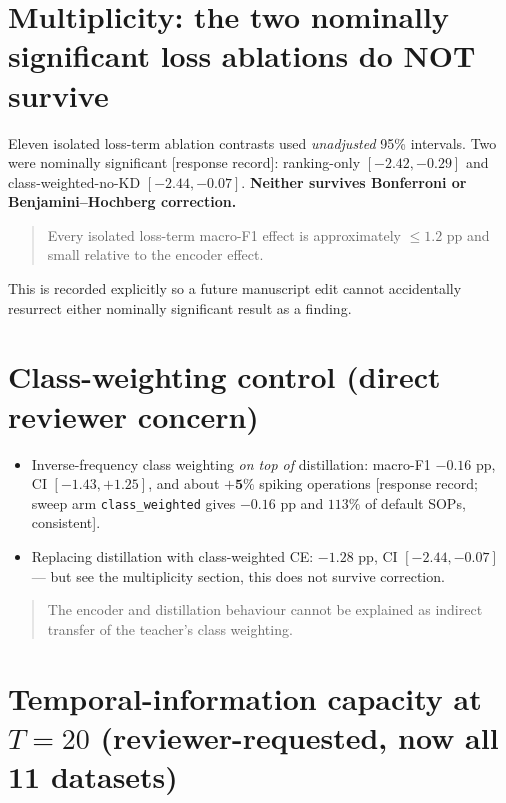 \section*{Multiplicity: the two nominally significant loss ablations do NOT survive}

Eleven isolated loss-term ablation contrasts used \emph{unadjusted} 95\% intervals. Two
were nominally significant \textup{[response record]}: ranking-only $[-2.42, -0.29]$ and
class-weighted-no-KD $[-2.44, -0.07]$. \textbf{Neither survives Bonferroni or
Benjamini--Hochberg correction.}

\begin{quote}
Every isolated loss-term macro-F1 effect is approximately $\leq 1.2$ pp and small relative
to the encoder effect.
\end{quote}

\noindent This is recorded explicitly so a future manuscript edit cannot accidentally
resurrect either nominally significant result as a finding.

\section*{Class-weighting control (direct reviewer concern)}

\begin{itemize}
  \item Inverse-frequency class weighting \emph{on top of} distillation: macro-F1
        $\mathbf{-0.16}$ pp, CI $[-1.43, +1.25]$, and about $\mathbf{+5\%}$ spiking
        operations \textup{[response record; sweep arm \texttt{class\_weighted} gives
        $-0.16$ pp and $113\%$ of default SOPs, consistent]}.
  \item Replacing distillation with class-weighted CE: $\mathbf{-1.28}$ pp,
        CI $[-2.44, -0.07]$ --- but see the multiplicity section, this does not survive
        correction.
\end{itemize}

\begin{quote}
The encoder and distillation behaviour cannot be explained as indirect transfer of the
teacher's class weighting.
\end{quote}

\section*{Temporal-information capacity at $T=20$ (reviewer-requested, now all 11 datasets)}

